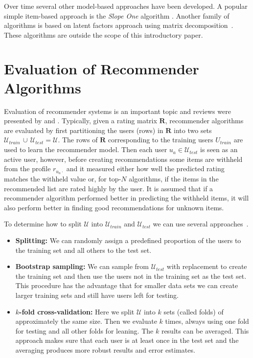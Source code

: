 \documentclass[nojss]{jss}
\newcommand{\set}[1]{\mathcal{#1}}
\newcommand{\mat}[1]{{\mathbf{#1}}}
\begin{document}
Over time several other model-based approaches have been developed.
A popular simple item-based approach is the \emph{Slope One}
algorithm \citep{recommender:Lemire:2005}.
Another family of algorithms is based on latent factors approach using
matrix decomposition~\citep{recommender:Koren:2009}.
These algorithms are outside the scope of this introductory paper.

\section{Evaluation of Recommender Algorithms}
\label{sec:evaluation}

Evaluation of recommender systems is an important topic and
reviews were presented
by \cite{recommender:Herlocker:2004}
and \cite{recommender:Gunawardana:2009}.
Typically,
given a rating matrix $\mat{R}$,
recommender algorithms are evaluated by first
partitioning the users (rows) in $\mat{R}$ into two
sets $\set{U}_\mathit{train}\, \cup\, \set{U}_\mathit{test} = \set{U}$.
The rows of $\mat{R}$ corresponding to the training users $U_\mathit{train}$
are used to learn the recommender model.
Then each user $u_a \in \set{U}_\mathit{test}$ is seen as an active user,
however,
before creating recommendations some items are withheld from the
profile $r_{u_a\cdot}$ and it measured
either how well the predicted rating matches the withheld value
or, for top-$N$ algorithms, if the items in the recommended
list are rated highly by the user.
It is assumed that if
a recommender algorithm performed better in predicting the withheld items,
it will also perform better in finding good recommendations for unknown items.

To determine how to split $\set{U}$ into
$\set{U}_\mathit{train}$ and $\set{U}_\mathit{test}$ we can use
several approaches~\citep{recommender:Kohavi:1995}.
\begin{itemize}
\item {\bf Splitting:}
We can randomly assign a predefined proportion of the users
to the training set and all others to the test set.
\item {\bf Bootstrap sampling:}
We can sample from $\set{U}_\mathit{test}$ with replacement
to create the training set and then use the users not in the training set as
the test set. This procedure has the advantage that for smaller data sets
we can create larger training sets and still have users left for testing.
\item {\bf $k$-fold cross-validation:} Here we split $\set{U}$ into $k$ sets
(called folds) of approximately the same size. Then we evaluate $k$ times,
always using one fold for testing and all other folds for leaning. The $k$
results can be averaged. This approach makes sure that each user is at least
once in the test set and the averaging produces more robust results and error
estimates.
\end{itemize}
\end{document}

